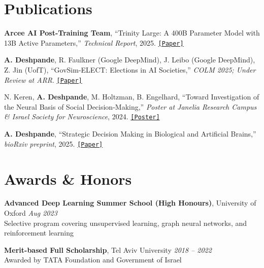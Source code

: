 \documentclass[a4paper,10pt]{article}
\begin{document}
\section{Publications}
\begin{enumerate}[label={[\arabic*]}]
    \item \textbf{Arcee AI Post-Training Team}, ``Trinity Large: A 400B Parameter Model with 13B Active Parameters,'' \textit{Technical Report}, 2025. \href{https://github.com/arcee-ai/trinity-large-tech-report/blob/main/Arcee\%20Trinity\%20Large.pdf}{\texttt{[Paper]}}
    
    \item \textbf{A. Deshpande}, R. Faulkner (Google DeepMind), J. Leibo (Google DeepMind), Z. Jin (UofT), ``GovSim-ELECT: Elections in AI Societies,'' \textit{COLM 2025; Under Review at ARR}. \href{https://drive.google.com/file/d/1EMZmIa8oHfhfsRJN0OmWRZy8Zdq1q2Mz/view}{\texttt{[Paper]}}
    
    \item N. Keren, \textbf{A. Deshpande}, M. Holtzman, B. Engelhard, ``Toward Investigation of the Neural Basis of Social Decision-Making,'' \textit{Poster at Janelia Research Campus \& Israel Society for Neuroscience}, 2024. \href{https://mcn25-hhmi.ipostersessions.com/default.aspx?s=9A-BC-53-DD-EC-6F-BB-03-E9-38-BA-F8-CE-47-8C-06&guestview=true}{\texttt{[Poster]}}

    \item \textbf{A. Deshpande}, ``Strategic Decision Making in Biological and Artificial Brains,'' \textit{bioRxiv preprint}, 2025. \href{https://doi.org/10.1101/2025.02.17.638746}{\texttt{[Paper]}}
\end{enumerate}



\section{Awards \& Honors}

\vspace{4pt}
\textbf{Advanced Deep Learning Summer School (High Honours)}, University of Oxford \hfill \textit{Aug 2023}\\
Selective program covering unsupervised learning, graph neural networks, and reinforcement learning

\vspace{4pt}
\textbf{Merit-based Full Scholarship}, Tel Aviv University \hfill \textit{2018 -- 2022}\\
Awarded by TATA Foundation and Government of Israel
\end{document}
